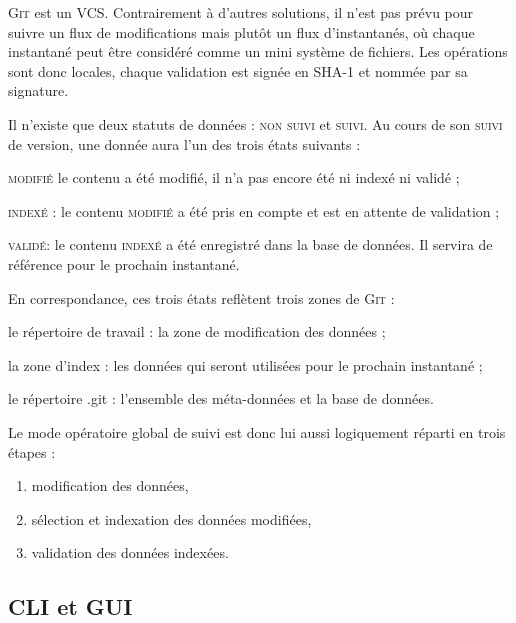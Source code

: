 \documentclass[11pt,twoside,headings=normal,open=right,french,DIV=12]{scrreprt}
\newcommand{\git}{\textsc{Git}}
\begin{document}
    \smallskip

    \git{} est un \textsc{VCS}. Contrairement à d'autres solutions, il n'est pas prévu pour suivre un flux de
    modifications mais plutôt un flux d'instantanés, où chaque instantané peut être considéré comme \og{}un mini système de
    fichiers\fg. Les opérations sont donc locales, chaque validation est signée en \textsc{SHA-1} et nommée par sa signature.

    \smallskip

    Il n'existe que deux statuts de données : \textsc{non suivi} et \textsc{suivi}. Au cours de son \textsc{suivi} de version,
    une donnée aura l'un des trois états suivants :
    \begin{description}
        \item \textsc{modifié} le contenu a été modifié, il n'a pas encore été ni indexé ni validé ;
        \item \textsc{indexé :} le contenu \textsc{modifié} a été pris en compte et est en attente de validation ;
        \item \textsc{validé: } le contenu \textsc{indexé} a été enregistré dans la base de données. Il servira de référence pour le
        prochain instantané.
    \end{description}
    
    En correspondance, ces trois états reflètent trois zones de \git{} :
    \begin{description}
        \item {le répertoire de travail :} la zone de modification des données ;
        \item {la zone d'index : } les données qui seront utilisées pour le prochain instantané ;
        \item {le répertoire .git : } l'ensemble des méta-données et la base de données.
    \end{description}
    
    Le mode opératoire global de suivi est donc lui aussi logiquement réparti en trois étapes :
    \begin{enumerate}
        \item modification des données,
        \item sélection et indexation des données modifiées,
        \item validation des données indexées.
    \end{enumerate}        



\subsection{CLI et GUI}
\end{document}
